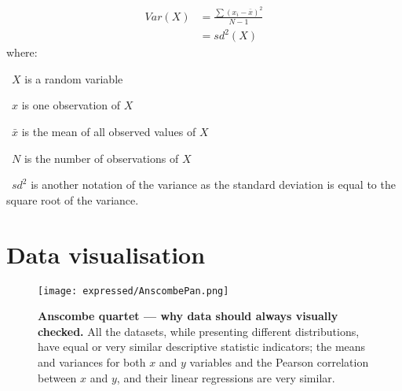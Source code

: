 \begin{equation}\label{eq:variance}
    \tag{Variance}
    \begin{split}
        Var(X) & =  \frac{\sum{{(x_{i}-\bar{x})}^{2}}}{N-1} \\ & = sd^{2}(X)
    \end{split}
\end{equation}
where:
\quad\begin{eqlist}[\setlength{\itemsep}{0em}%
            \setlength{\topsep}{0em}%
            \setlength{\partopsep}{0em}%
            \setlength{\parskip}{0em}%
            \setlength{\parsep}{0em}]
    \item[\textbullet\ $X$] is a random variable
    \item[\textbullet\ $x$] is one observation of $X$
    \item[\textbullet\ $\bar{x}$] is the mean of all observed values of $X$
    \item[\textbullet\ $N$] is the number of observations of $X$
    \item[\textbullet\ $sd^2$] is another notation of the variance as
           the standard deviation is equal to the square root of the variance.
\end{eqlist}

\section{Data visualisation}


\begin{figure}[!ht]
    \texttt{[image: expressed/AnscombePan.png]}\centering
    \caption[Anscombe quartet --- why data should always be visualy checked]
    {\label{fig:Anscombe}\textbf{Anscombe quartet --- why data should always
    visually checked.}\smallbreak{} All the datasets, while presenting
    different distributions, have equal or very similar descriptive statistic
    indicators;
    the means and variances for both $x$ and $y$ variables and
    the Pearson correlation between $x$ and $y$, and
    their linear regressions are very similar.}
\end{figure}

